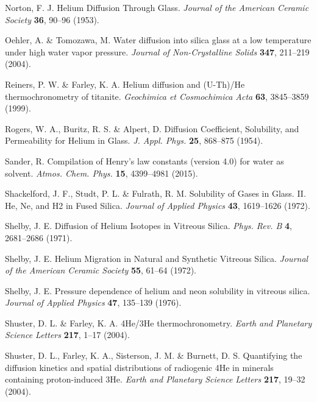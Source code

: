 \documentclass[gchron, manuscript]{copernicus}
\begin{document}
\begin{thebibliography}{}
Norton, F. J. Helium Diffusion Through Glass. \emph{Journal of the American Ceramic Society} \textbf{36}, 90--96 (1953).

Oehler, A. \& Tomozawa, M. Water diffusion into silica glass at a low temperature under high water vapor pressure. \emph{Journal of Non-Crystalline Solids} \textbf{347}, 211--219 (2004).

Reiners, P. W. \& Farley, K. A. Helium diffusion and (U-Th)/He thermochronometry of titanite. \emph{Geochimica et Cosmochimica Acta} \textbf{63}, 3845--3859 (1999).

Rogers, W. A., Buritz, R. S. \& Alpert, D. Diffusion Coefficient, Solubility, and Permeability for Helium in Glass. \emph{J. Appl. Phys.} \textbf{25}, 868--875 (1954).

Sander, R. Compilation of Henry's law constants (version 4.0) for water as solvent. \emph{Atmos. Chem. Phys.} \textbf{15}, 4399--4981 (2015).

Shackelford, J. F., Studt, P. L. \& Fulrath, R. M. Solubility of Gases in Glass. II. He, Ne, and H2 in Fused Silica. \emph{Journal of Applied Physics} \textbf{43}, 1619--1626 (1972).

Shelby, J. E. Diffusion of Helium Isotopes in Vitreous Silica. \emph{Phys. Rev. B} \textbf{4}, 2681--2686 (1971).

Shelby, J. E. Helium Migration in Natural and Synthetic Vitreous Silica. \emph{Journal of the American Ceramic Society} \textbf{55}, 61--64 (1972).

Shelby, J. E. Pressure dependence of helium and neon solubility in vitreous silica. \emph{Journal of Applied Physics} \textbf{47}, 135--139 (1976).

Shuster, D. L. \& Farley, K. A. 4He/3He thermochronometry. \emph{Earth and Planetary Science Letters} \textbf{217}, 1--17 (2004).

Shuster, D. L., Farley, K. A., Sisterson, J. M. \& Burnett, D. S. Quantifying the diffusion kinetics and spatial distributions of radiogenic 4He in minerals containing proton-induced 3He. \emph{Earth and Planetary Science Letters} \textbf{217}, 19--32 (2004).


\end{thebibliography}
\end{document}
